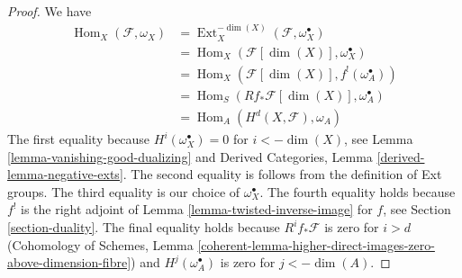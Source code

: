 \documentclass[10pt,a4paper]{amsart}
\theoremstyle{plain}
\theoremstyle{definition}
\theoremstyle{remark}
\numberwithin{equation}{subsection}
\def\Hom{\mathop{\mathrm{Hom}}\nolimits}
\def\Ext{\mathop{\mathrm{Ext}}\nolimits}
\begin{document}
\begin{proof}
We have
\begin{align*}
\Hom_X(\mathcal{F}, \omega_X)
& =
\Ext^{-\dim(X)}_X(\mathcal{F}, \omega_X^\bullet) \\
& =
\Hom_X(\mathcal{F}[\dim(X)], \omega_X^\bullet) \\
& =
\Hom_X(\mathcal{F}[\dim(X)], f^!(\omega_A^\bullet)) \\
& =
\Hom_S(Rf_*\mathcal{F}[\dim(X)], \omega_A^\bullet) \\
& =
\Hom_A(H^d(X, \mathcal{F}), \omega_A)
\end{align*}
The first equality because $H^i(\omega_X^\bullet) = 0$ for
$i < -\dim(X)$, see Lemma \ref{lemma-vanishing-good-dualizing} and
Derived Categories, Lemma \ref{derived-lemma-negative-exts}.
The second equality is follows from the definition of Ext groups.
The third equality is our choice of $\omega_X^\bullet$.
The fourth equality holds because $f^!$ is the
right adjoint of Lemma \ref{lemma-twisted-inverse-image} for
$f$, see Section \ref{section-duality}.
The final equality holds because $R^if_*\mathcal{F}$ is zero
for $i > d$ (Cohomology of Schemes, Lemma
\ref{coherent-lemma-higher-direct-images-zero-above-dimension-fibre})
and $H^j(\omega_A^\bullet)$ is zero for $j < -\dim(A)$.
\end{proof}
\end{document}
